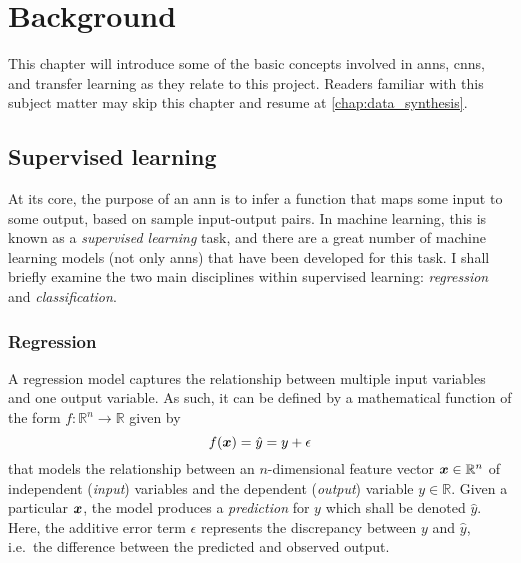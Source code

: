\documentclass[../report.tex]{subfiles}
\begin{document}
\chapter{Background}
This chapter will introduce some of the basic concepts involved in \glspl{ann}, \glspl{cnn}, and transfer learning as they relate to this project.
Readers familiar with this subject matter may skip this chapter and resume at \cref{chap:data_synthesis}.

\section{Supervised learning}
At its core, the purpose of an \gls{ann} is to infer a function that maps some input to some output, based on sample input-output pairs.
In machine learning, this is known as a \emph{supervised learning} task, and there are a great number of machine learning models (not only \glspl{ann}) that have been developed for this task.
I shall briefly examine the two main disciplines within supervised learning: \emph{regression} and \emph{classification}.

\subsection{Regression}
\label{sec:regression}
A regression model captures the relationship between multiple input variables and one output variable. 
As such, it can be defined by a mathematical function of the form $f:\mathbb{R}^n\rightarrow \mathbb{R}$ given by
\begin{equation}
    \label{eq:reg_model}
    f({\bm{x}}) = \hat{y} = y + \epsilon
\end{equation}
that models the relationship between an $n$-dimensional feature vector ${\bm{x}} \in \mathbb{R}^n$ of independent (\emph{input}) variables and the dependent (\emph{output}) variable $y \in \mathbb{R}$. 
Given a particular ${\bm{x}}$, the model produces a \emph{prediction} for $y$ which shall be denoted $\hat{y}$.
Here, the additive error term $\epsilon$ represents the discrepancy between $y$ and $\hat{y}$, i.e.\ the difference between the predicted and observed output.
\end{document}

